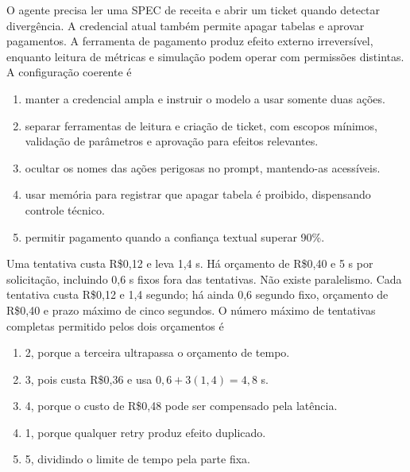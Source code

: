 \TextoBase
O agente precisa ler uma SPEC de receita e abrir um ticket quando detectar divergência. A credencial atual também permite apagar tabelas e aprovar pagamentos.
A ferramenta de pagamento produz efeito externo irreversível, enquanto leitura de métricas e simulação podem operar com permissões distintas.
\FonteDidatica
\Comando A configuração coerente é
\begin{enumerate}[label=\Alph*)]
\item manter a credencial ampla e instruir o modelo a usar somente duas ações.
\item separar ferramentas de leitura e criação de ticket, com escopos mínimos, validação de parâmetros e aprovação para efeitos relevantes.
\item ocultar os nomes das ações perigosas no prompt, mantendo-as acessíveis.
\item usar memória para registrar que apagar tabela é proibido, dispensando controle técnico.
\item permitir pagamento quando a confiança textual superar 90\%.
\end{enumerate}

\TextoBase
Uma tentativa custa R\$0,12 e leva 1,4 s. Há orçamento de R\$0,40 e 5 s por solicitação, incluindo 0,6 s fixos fora das tentativas. Não existe paralelismo.
Cada tentativa custa R\$0,12 e 1,4 segundo; há ainda 0,6 segundo fixo, orçamento de R\$0,40 e prazo máximo de cinco segundos.
\FonteDidatica
\Comando O número máximo de tentativas completas permitido pelos dois orçamentos é
\begin{enumerate}[label=\Alph*)]
\item 2, porque a terceira ultrapassa o orçamento de tempo.
\item 3, pois custa R\$0,36 e usa $0{,}6+3(1{,}4)=4{,}8$ s.
\item 4, porque o custo de R\$0,48 pode ser compensado pela latência.
\item 1, porque qualquer retry produz efeito duplicado.
\item 5, dividindo o limite de tempo pela parte fixa.
\end{enumerate}

